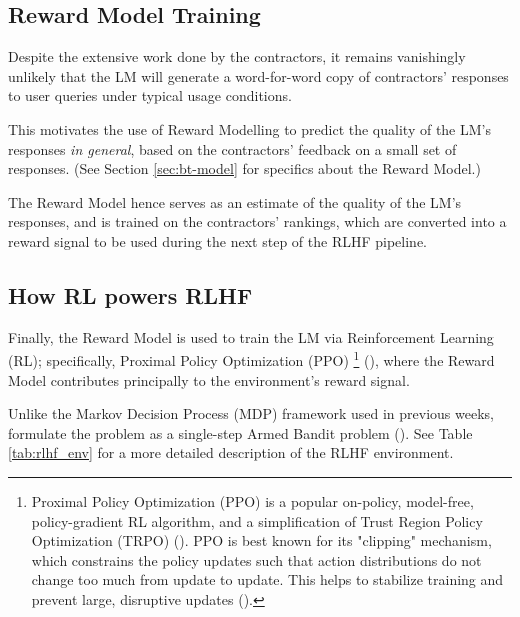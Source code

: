 \documentclass{article} %
\begin{document}
\subsection{Reward Model Training}

Despite the extensive work done by the contractors, it remains vanishingly unlikely 
that the LM will generate a word-for-word copy of contractors' responses to user 
queries under typical usage conditions. 

This motivates the use of Reward Modelling to predict the quality of the 
LM's responses \textit{in general}, based on the contractors' feedback 
on a small set of responses. (See Section \ref{sec:bt-model} for specifics about the Reward Model.)

The Reward Model hence serves as an estimate of the quality of the LM's responses,
and is trained on the contractors' rankings, which are converted into a reward signal
to be used during the next step of the RLHF pipeline.

\subsection{How RL powers RLHF}
Finally, the Reward Model is used to train the LM via Reinforcement Learning (RL);
specifically, Proximal Policy Optimization (PPO) \footnote{
    Proximal Policy Optimization (PPO) is a popular on-policy, model-free, policy-gradient RL algorithm,
    and a simplification of Trust Region Policy Optimization (TRPO)
    (\cite{Schulman-et-al-2015, Schulman-et-al-2017}).
    PPO is best known for its "clipping" mechanism, which constrains the policy updates
    such that action distributions do not change too much from update to update.
    This helps to stabilize training and prevent large, disruptive updates
    (\cite{Schulman-et-al-2017}).
} (\cite{Schulman-et-al-2017}),
where the Reward Model contributes principally to the environment's reward signal.

Unlike the Markov Decision Process (MDP) framework used in previous weeks,
\cite{InstructGPT-2022} formulate the problem as a single-step Armed Bandit problem
(\cite{Sutton-and-Barto-1998}). See Table \ref{tab:rlhf_env} for a more detailed description 
of the RLHF environment.
\end{document}
